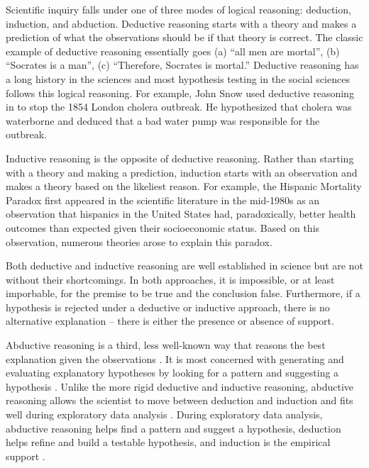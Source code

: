 \documentclass[12pt]{article}
\begin{document}
Scientific inquiry falls under one of three modes of logical reasoning:
deduction, induction, and abduction. Deductive reasoning starts with a
theory and makes a prediction of what the observations should be if that
theory is correct. The classic example of deductive reasoning
essentially goes (a) ``all men are mortal'', (b) ``Socrates is a man'',
(c) ``Therefore, Socrates is mortal.'' Deductive reasoning has a long
history in the sciences and most hypothesis testing in the social
sciences follows this logical reasoning. For example, John Snow used
deductive reasoning in to stop the 1854 London cholera outbreak. He
hypothesized that cholera was waterborne and deduced that a bad water
pump was responsible for the outbreak.

Inductive reasoning is the opposite of deductive reasoning. Rather than
starting with a theory and making a prediction, induction starts with an
observation and makes a theory based on the likeliest reason. For
example, the Hispanic Mortality Paradox first appeared in the scientific
literature in the mid-1980s \citep{markides1986health} as an observation
that hispanics in the United States had, paradoxically, better health
outcomes than expected given their socioeconomic status. Based on this
observation, numerous theories arose to explain this paradox.

Both deductive and inductive reasoning are well established in science
but are not without their shortcomings. In both approaches, it is
impossible, or at least imporbable, for the premise to be true and the
conclusion false. Furthermore, if a hypothesis is rejected under a
deductive or inductive approach, there is no alternative explanation --
there is either the presence or absence of support.

Abductive reasoning is a third, less well-known way that reasons the
best explanation given the observations \citep{walton2014abductive}. It
is most concerned with generating and evaluating explanatory hypotheses
\citep{Crowder2017} by looking for a pattern and suggesting a hypothesis
\citep{fann2012peirce, pierce1878deduction}. Unlike the more rigid
deductive and inductive reasoning, abductive reasoning allows the
scientist to move between deduction and induction and fits well during
exploratory data analysis
\citep{yu1994abduction, haig2015commentary, tukey1977exploratory}.
During exploratory data analysis, abductive reasoning helps find a
pattern and suggest a hypothesis, deduction helps refine and build a
testable hypothesis, and induction is the empirical support
\citep{yu1994abduction}.
\end{document}
